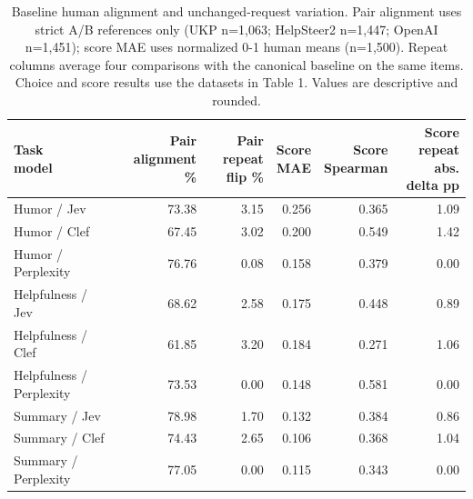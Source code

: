 \begin{table}[t]
\centering\footnotesize
\setlength{\tabcolsep}{3.5pt}
\begin{tabular}{@{}lrrrrr@{}}
\toprule
\shortstack[l]{Task\\{}model} & \shortstack[l]{Pair alignment\\{}\%} & \shortstack[l]{Pair repeat\\{}flip \%} & \shortstack[l]{Score\\{}MAE} & \shortstack[l]{Score\\{}Spearman} & \shortstack[l]{Score repeat\\{}abs. delta pp} \\
\midrule
Humor / Jev & 73.38 & 3.15 & 0.256 & 0.365 & 1.09 \\
Humor / Clef & 67.45 & 3.02 & 0.200 & 0.549 & 1.42 \\
Humor / Perplexity & 76.76 & 0.08 & 0.158 & 0.379 & 0.00 \\
Helpfulness / Jev & 68.62 & 2.58 & 0.175 & 0.448 & 0.89 \\
Helpfulness / Clef & 61.85 & 3.20 & 0.184 & 0.271 & 1.06 \\
Helpfulness / Perplexity & 73.53 & 0.00 & 0.148 & 0.581 & 0.00 \\
Summary / Jev & 78.98 & 1.70 & 0.132 & 0.384 & 0.86 \\
Summary / Clef & 74.43 & 2.65 & 0.106 & 0.368 & 1.04 \\
Summary / Perplexity & 77.05 & 0.00 & 0.115 & 0.343 & 0.00 \\
\bottomrule
\end{tabular}
\caption{Baseline human alignment and unchanged-request variation. Pair alignment uses strict A/B references only (UKP n=1,063; HelpSteer2 n=1,447; OpenAI n=1,451); score MAE uses normalized 0-1 human means (n=1,500). Repeat columns average four comparisons with the canonical baseline on the same items. Choice and score results use the datasets in Table 1. Values are descriptive and rounded.}
\label{tab:results_baseline}
\end{table}
